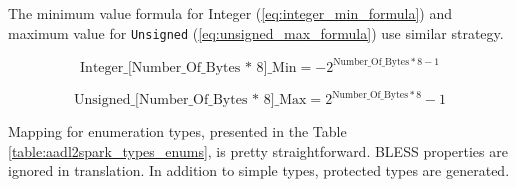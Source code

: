 The minimum value formula for Integer (\ref{eq:integer_min_formula}) and maximum value for \lstinline{Unsigned} (\ref{eq:unsigned_max_formula}) use similar strategy.

\begin{equation} \label{eq:integer_min_formula}
	\text{Integer\_[Number\_Of\_Bytes * 8]\_Min} = -2^{\text{Number\_Of\_Bytes} * 8 - 1}
\end{equation}

\begin{equation} \label{eq:unsigned_max_formula}
	\text{Unsigned\_[Number\_Of\_Bytes * 8]\_Max} = 2^{\text{Number\_Of\_Bytes} * 8} - 1
\end{equation}

Mapping for enumeration types, presented in the Table \ref{table:aadl2spark_types_enums}, is pretty straightforward. BLESS properties are ignored in translation. In addition to simple types, protected types are generated.


